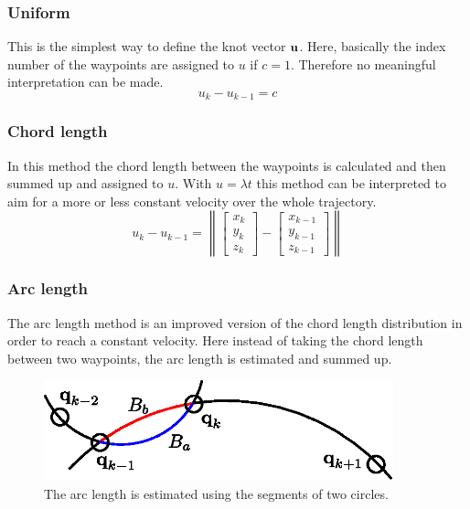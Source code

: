 \subsubsection{Uniform}
This is the simplest way to define the knot vector $\bf u$. Here, basically the index number of the waypoints are assigned to $u$ if $c=1$. Therefore no meaningful interpretation can be made.
\begin{equation*}
u_k-u_{k-1}= c
\end{equation*}
\subsubsection{Chord length}
In this method the chord length between the waypoints is calculated and then summed up and assigned to $u$. With $u=\lambda t$ this method can be interpreted to aim for a more or less constant velocity over the whole trajectory.
\begin{equation*}
u_k-u_{k-1}=\left \| \begin{bmatrix}x_k\\y_k\\z_k \end{bmatrix}-\begin{bmatrix}x_{k-1}\\y_{k-1}\\z_{k-1} \end{bmatrix}\right \|
\end{equation*}
\subsubsection{Arc length}
The arc length method is an improved version of the chord length distribution in order to reach a constant velocity. Here instead of taking the chord length between two waypoints, the arc length is estimated and summed up. %


\begin{figure}[H]
	\centering
    \includegraphics[width = 0.9\textwidth]{graphics/arcLength.eps}
  \caption{The arc length is estimated using the segments of two circles.}
  \label{fig:arcLength}
\end{figure}


